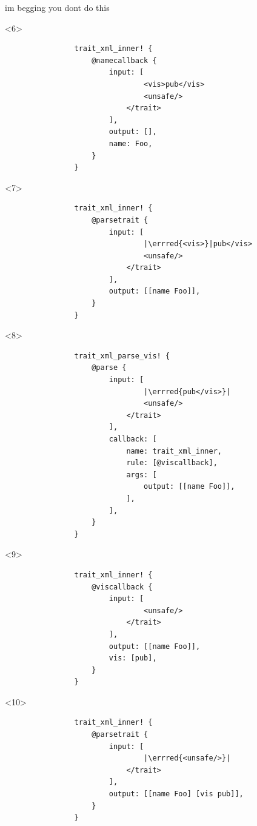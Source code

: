 \documentclass{beamer}
\newcommand{\errred}[1]{{\color{errredcolour}#1}}
\begin{document}
\begin{frame}[fragile]{im begging you dont do this}
		\pause

		\begin{onlyenv}<6>
			\begin{verbatim}
				trait_xml_inner! {
					@namecallback {
						input: [
								<vis>pub</vis>
								<unsafe/>
							</trait>
						],
						output: [],
						name: Foo,
					}
				}
			\end{verbatim}
		\end{onlyenv}

		\pause

		\begin{onlyenv}<7>
			\begin{verbatim}
				trait_xml_inner! {
					@parsetrait {
						input: [
								|\errred{<vis>}|pub</vis>
								<unsafe/>
							</trait>
						],
						output: [[name Foo]],
					}
				}
			\end{verbatim}
		\end{onlyenv}

		\pause

		\begin{onlyenv}<8>
			\begin{verbatim}
				trait_xml_parse_vis! {
					@parse {
						input: [
								|\errred{pub</vis>}|
								<unsafe/>
							</trait>
						],
						callback: [
							name: trait_xml_inner,
							rule: [@viscallback],
							args: [
								output: [[name Foo]],
							],
						],
					}
				}
			\end{verbatim}
		\end{onlyenv}

		\pause

		\begin{onlyenv}<9>
			\begin{verbatim}
				trait_xml_inner! {
					@viscallback {
						input: [
								<unsafe/>
							</trait>
						],
						output: [[name Foo]],
						vis: [pub],
					}
				}
			\end{verbatim}
		\end{onlyenv}

		\pause

		\begin{onlyenv}<10>
			\begin{verbatim}
				trait_xml_inner! {
					@parsetrait {
						input: [
								|\errred{<unsafe/>}|
							</trait>
						],
						output: [[name Foo] [vis pub]],
					}
				}
			\end{verbatim}
		\end{onlyenv}


\end{frame}
\end{document}
